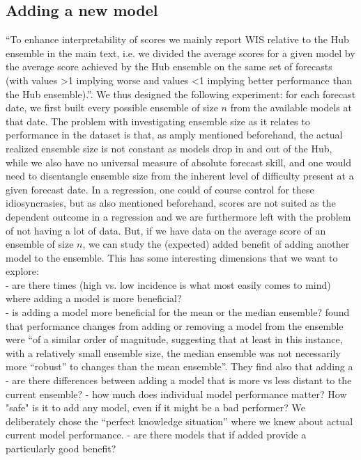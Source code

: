 \subsection{Adding a new model}
``To enhance
interpretability of scores we mainly report WIS relative to the Hub ensemble in the main text, i.e. we divided
the average scores for a given model by the average score achieved by the Hub ensemble on the same set of
forecasts (with values >1 implying worse and values <1 implying better performance than the Hub ensemble).''\cite{bosse_comparing_2021}.
We thus designed the following experiment: for each forecast date, we first built every possible ensemble of size $n$ from the available models at that date. The problem with investigating ensemble size as it relates to performance in the dataset is that, as amply mentioned beforehand, the actual realized ensemble size is not constant as models drop in and out of the Hub, while we also have no universal measure of absolute forecast skill, and one would need to disentangle ensemble size from the inherent level of difficulty present at a given forecast date. In a regression, one could of course control for these idiosyncrasies, but as also mentioned beforehand, scores are not suited as the dependent outcome in a regression and we are furthermore left with the problem of not having a lot of data. But, if we have data on the average score of an ensemble of size $n$, we can study the (expected) added benefit of adding another model to the ensemble. This has some interesting dimensions that we want to explore:\\
- are there times (high vs. low incidence is what most easily comes to mind) where adding a model is more beneficial?\\
- is adding a model more beneficial for the mean or the median ensemble? \cite{bosse_comparing_2021} found that performance changes from adding or removing a model from the ensemble were ``of a similar order of magnitude, suggesting that at least in this instance, with a relatively small ensemble size, the median ensemble was not necessarily more ``robust'' to changes than the mean ensemble''. They find also that adding a 
- are there differences between adding a model that is more vs less distant to the current ensemble?
- how much does individual model performance matter? How "safe" is it to add any model, even if it might be a bad performer? We deliberately chose the ``perfect knowledge situation'' where we knew about actual current model performance. 
- are there models that if added provide a particularly good benefit?

